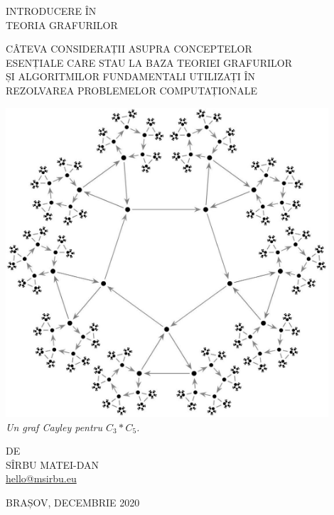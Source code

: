 \documentclass[9pt,a4paper]{report}
\begin{document}
\thispagestyle{empty}

\begin{center}
    \bfseries

    \Huge
    INTRODUCERE ÎN \\
    TEORIA GRAFURILOR
    \vspace{25pt}

    \normalsize
    CÂTEVA CONSIDERAȚII ASUPRA CONCEPTELOR \\
    ESENȚIALE CARE STAU LA BAZA TEORIEI GRAFURILOR \\
    ȘI ALGORITMILOR FUNDAMENTALI UTILIZAȚI ÎN \\
    REZOLVAREA PROBLEMELOR COMPUTAȚIONALE \\
    \vspace{25pt}

    \includegraphics[width=0.9\textwidth]{img/cayley_graph} \\ 
    \textnormal{\textit{Un graf Cayley pentru $C_3 * C_5$.}}
    \vspace{25pt}
    
    \small 
    DE\\
    
    \Large 
    SÎRBU MATEI-DAN \\ 
    \href{mailto:hello@msirbu.eu}{hello@msirbu.eu} \\
    \vspace{25pt}

    BRAȘOV, DECEMBRIE 2020
\end{center}
\end{document}
